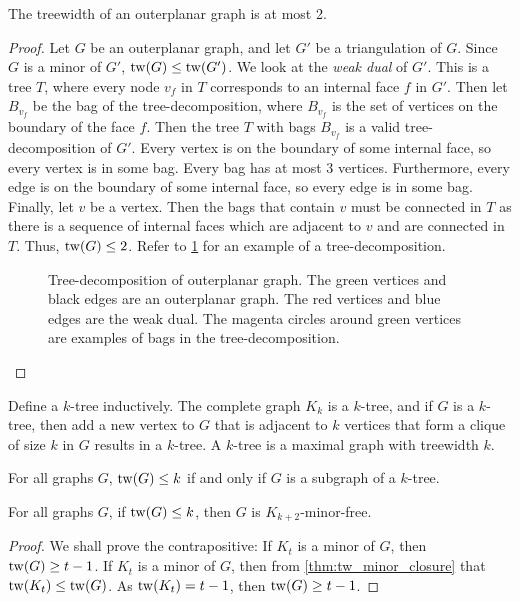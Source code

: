 \begin{lemma}\label{ex:tw_outerplanar}
	The treewidth of an outerplanar graph is at most 2.
\end{lemma}
\begin{proof}
	Let \(G\) be an outerplanar graph, and let \(G'\) be a triangulation of \(G\). Since \(G\) is a minor of \(G'\), \(\operatorname{tw}(G) \leq \operatorname{tw}(G')\). We look at the \textit{weak dual} of \(G'\). This is a tree \(T\), where every node \(v_f\) in \(T\) corresponds to an internal face \(f\) in \(G'\). Then let \(B_{v_f}\) be the bag of the tree-decomposition, where \(B_{v_f}\) is the set of vertices on the boundary of the face \(f\). Then the tree \(T\) with bags \(B_{v_f}\) is a valid tree-decomposition of \(G'\). Every vertex is on the boundary of some internal face, so every vertex is in some bag. Every bag has at most 3 vertices. Furthermore, every edge is on the boundary of some internal face, so every edge is in some bag. Finally, let $v$ be a vertex. Then the bags that contain $v$ must be connected in $T$ as there is a sequence of internal faces which are adjacent to $v$ and are connected in $T$. Thus, \(\operatorname{tw}(G) \leq 2\). Refer to \cref{fig:outerplanar_treedecomp} for an example of a tree-decomposition. 
	\begin{figure}[h]\label{fig:outerplanar_treedecomp}
		
		\caption{Tree-decomposition of outerplanar graph. The green vertices and black edges are an outerplanar graph. The red vertices and blue edges are the weak dual. The magenta circles around green vertices are examples of bags in the tree-decomposition.}
	\end{figure}
\end{proof}

Define a \(k\)-tree inductively. The complete graph \(K_k\) is a \(k\)-tree, and if \(G\) is a \(k\)-tree, then add a new vertex to \(G\) that is adjacent to \(k\) vertices that form a clique of size \(k\) in \(G\) results in a \(k\)-tree.
A \(k\)-tree is a maximal graph with treewidth \(k\).
\begin{theorem}
	For all graphs $G$, \(\operatorname{tw}(G) \leq k\) if and only if \(G\) is a subgraph of a \(k\)-tree.
\end{theorem}


\begin{theorem}\label{thm:treewidth_clique-minor-free}
	For all graphs $G$, if \(\operatorname{tw}(G) \leq k\), then \(G\) is \(K_{k+2}\)-minor-free.
\end{theorem}
\begin{proof}
	We shall prove the contrapositive: If \(K_t\) is a minor of \(G\), then \(\operatorname{tw}(G) \geq t-1\).
	If \(K_t\) is a minor of \(G\), then from \cref{thm:tw_minor_closure} that \(\operatorname{tw}(K_t) \leq \operatorname{tw}(G)\). As \(\operatorname{tw}(K_t) = t-1\), then \(\operatorname{tw}(G) \geq t - 1\).
\end{proof}

